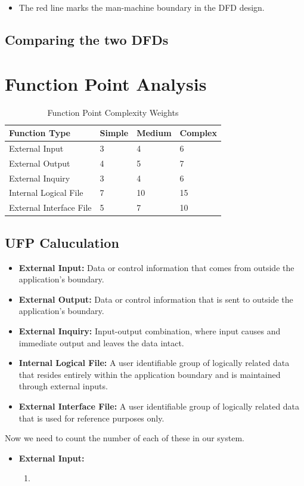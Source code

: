 \documentclass[11pt]{article}
\begin{document}
\begin{itemize}
    \item The red line marks the man-machine boundary in the DFD design.
\end{itemize}
\newpage
\subsection{Comparing the two DFDs}
\newpage
\section{Function Point Analysis}
\begin{table}[H]
    \centering
    \begin{tabular}{|p{3cm}|p{3cm}|p{3cm}|p{3cm}|}
        \hline
        \textbf{Function Type}  & \textbf{Simple} & \textbf{Medium} & \textbf{Complex} \\
        \hline
        External Input          & 3               & 4               & 6                \\
        \hline
        External Output         & 4               & 5               & 7                \\
        \hline
        External Inquiry        & 3               & 4               & 6                \\
        \hline
        Internal Logical File   & 7               & 10              & 15               \\
        \hline
        External Interface File & 5               & 7               & 10               \\
        \hline
    \end{tabular}
    \caption{Function Point Complexity Weights}
\end{table}

\subsection{UFP Caluculation}

\begin{itemize}
    \item \textbf{External Input:} Data or control information that comes from outside the application's boundary.
    \item \textbf{External Output:} Data or control information that is sent to outside the application's boundary.
    \item \textbf{External Inquiry:} Input-output combination, where input causes and immediate output and leaves the data intact.
    \item \textbf{Internal Logical File:} A user identifiable group of logically related data that resides entirely within the application boundary and is maintained through external inputs.
    \item \textbf{External Interface File:} A user identifiable group of logically related data that is used for reference purposes only.
\end{itemize}

Now we need to count the number of each of these in our system.\\

\begin{itemize}
    \item \textbf{External Input:}
          \begin{enumerate}
              \item
          \end{enumerate}
\end{itemize}
\end{document}
